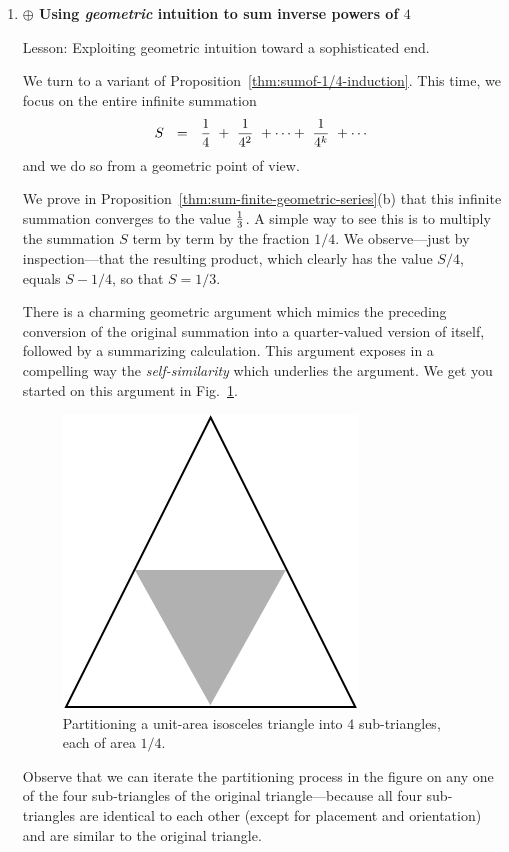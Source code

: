 \begin{enumerate}
\medskip\item
{\bf $\oplus$ Using {\em geometric} intuition to sum inverse powers of $4$}

{\sc Lesson:} Exploiting geometric intuition toward a sophisticated end.

\smallskip

We turn to a variant of Proposition~\ref{thm:sumof-1/4-induction}.  This time, we focus on the entire infinite summation
\[ S \ \ = \ \  {1 \over 4} \ + \  {1 \over 4^2} \ + \cdots + \ {1 \over 4^k} \ + \cdots  \]
and we do so from a geometric point of view.

\smallskip

We prove in Proposition~\ref{thm:sum-finite-geometric-series}(b) that this infinite summation converges to the value ${1 \over 3}$.  A simple way to see this is to multiply the summation $S$ term by term by the fraction $1/4$.  We observe---just by inspection---that the resulting product, which clearly has the value $S/4$, equals $S - 1/4$, so that $S = 1/3$.

\smallskip

There is a charming geometric argument which mimics the preceding conversion of the original summation into a quarter-valued version of itself, followed by a summarizing calculation.  This argument exposes in a compelling way the {\em self-similarity} which underlies the argument.  We get you started on this argument in Fig.~\ref{fig:Sum1over4}.
 \begin{figure}[ht]
\begin{center}
       \includegraphics[scale=0.35]{FiguresMaths/Sum1over4}
\caption{Partitioning a unit-area isosceles triangle into $4$ sub-triangles, each of area $1/4$.}
       \label{fig:Sum1over4}
\end{center}
\end{figure}
Observe that we can iterate the partitioning process in the figure on any one of the four sub-triangles of the original triangle---because all four sub-triangles are identical to each other (except for placement and orientation) and are similar to the original triangle.


\end{enumerate}
